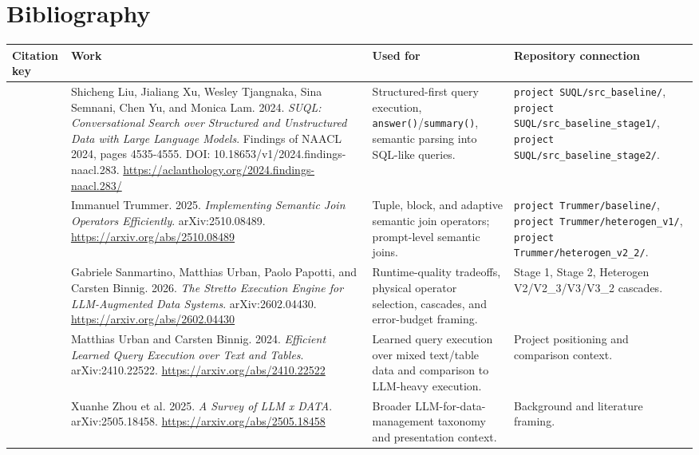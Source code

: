 \documentclass[11pt,oneside]{book}
\begin{document}
\chapter{Bibliography}
\begin{center}
\small
\renewcommand{\arraystretch}{1.25}
\begin{longtable}{@{}>{\RaggedRight\arraybackslash}p{}>{\RaggedRight\arraybackslash}p{}>{\RaggedRight\arraybackslash}p{}>{\RaggedRight\arraybackslash}p{}@{}}
\toprule
\textbf{Citation key} & \textbf{Work} & \textbf{Used for} & \textbf{Repository connection} \\
\midrule
\endhead
\relax [SUQL] & Shicheng Liu, Jialiang Xu, Wesley Tjangnaka, Sina Semnani, Chen Yu, and Monica Lam. 2024. \emph{SUQL: Conversational Search over Structured and Unstructured Data with Large Language Models}. Findings of NAACL 2024, pages 4535-4555. DOI: 10.18653/v1/2024.findings-naacl.283. \url{https://aclanthology.org/2024.findings-naacl.283/} & Structured-first query execution, \texttt{answer()}/\texttt{summary()}, semantic parsing into SQL-like queries. & \texttt{project SUQL/src\_baseline/}, \texttt{project SUQL/src\_baseline\_stage1/}, \texttt{project SUQL/src\_baseline\_stage2/}. \\
\relax [Trummer] & Immanuel Trummer. 2025. \emph{Implementing Semantic Join Operators Efficiently}. arXiv:2510.08489. \url{https://arxiv.org/abs/2510.08489} & Tuple, block, and adaptive semantic join operators; prompt-level semantic joins. & \texttt{project Trummer/baseline/}, \texttt{project Trummer/heterogen\_v1/}, \texttt{project Trummer/heterogen\_v2\_2/}. \\
\relax [Stretto] & Gabriele Sanmartino, Matthias Urban, Paolo Papotti, and Carsten Binnig. 2026. \emph{The Stretto Execution Engine for LLM-Augmented Data Systems}. arXiv:2602.04430. \url{https://arxiv.org/abs/2602.04430} & Runtime-quality tradeoffs, physical operator selection, cascades, and error-budget framing. & Stage 1, Stage 2, Heterogen V2/V2\_3/V3/V3\_2 cascades. \\
\relax [ELEET] & Matthias Urban and Carsten Binnig. 2024. \emph{Efficient Learned Query Execution over Text and Tables}. arXiv:2410.22522. \url{https://arxiv.org/abs/2410.22522} & Learned query execution over mixed text/table data and comparison to LLM-heavy execution. & Project positioning and comparison context. \\
\relax [LLMxDATA] & Xuanhe Zhou et al. 2025. \emph{A Survey of LLM x DATA}. arXiv:2505.18458. \url{https://arxiv.org/abs/2505.18458} & Broader LLM-for-data-management taxonomy and presentation context. & Background and literature framing. \\

\end{longtable}
\end{center}
\end{document}
